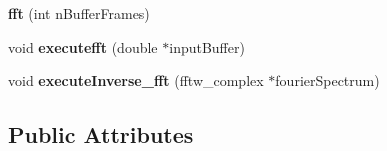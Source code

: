 \begin{DoxyCompactItemize}
\item 
\hypertarget{classfft_a5fff94ac07119207ddd05f628be5891d}{{\bfseries fft} (int n\-Buffer\-Frames)}\label{classfft_a5fff94ac07119207ddd05f628be5891d}

\item 
\hypertarget{classfft_a47e58fd4f715ad89a6fad8df9d715bf4}{void {\bfseries executefft} (double $\ast$input\-Buffer)}\label{classfft_a47e58fd4f715ad89a6fad8df9d715bf4}

\item 
\hypertarget{classfft_a228bd861564c189cd7b6800c950a1c09}{void {\bfseries execute\-Inverse\-\_\-fft} (fftw\-\_\-complex $\ast$fourier\-Spectrum)}\label{classfft_a228bd861564c189cd7b6800c950a1c09}

\end{DoxyCompactItemize}
\subsection*{Public Attributes}
